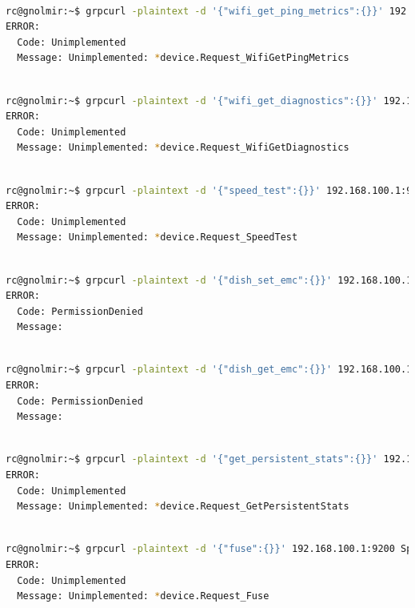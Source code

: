 \documentclass[IN,11pt,twoside,openright,bachelor,english]{tumthesis}
\begin{document}
\begin{lstlisting}[language=bash,basicstyle=\tiny]

rc@gnolmir:~$ grpcurl -plaintext -d '{"wifi_get_ping_metrics":{}}' 192.168.100.1:9200 SpaceX.API.Device.Device/Handle
ERROR:
  Code: Unimplemented
  Message: Unimplemented: *device.Request_WifiGetPingMetrics
  \end{lstlisting}
\begin{lstlisting}[language=bash,basicstyle=\tiny]

rc@gnolmir:~$ grpcurl -plaintext -d '{"wifi_get_diagnostics":{}}' 192.168.100.1:9200 SpaceX.API.Device.Device/Handle
ERROR:
  Code: Unimplemented
  Message: Unimplemented: *device.Request_WifiGetDiagnostics
  \end{lstlisting}
\begin{lstlisting}[language=bash,basicstyle=\tiny]

rc@gnolmir:~$ grpcurl -plaintext -d '{"speed_test":{}}' 192.168.100.1:9200 SpaceX.API.Device.Device/Handle
ERROR:
  Code: Unimplemented
  Message: Unimplemented: *device.Request_SpeedTest
 \end{lstlisting}
\begin{lstlisting}[language=bash,basicstyle=\tiny]

rc@gnolmir:~$ grpcurl -plaintext -d '{"dish_set_emc":{}}' 192.168.100.1:9200 SpaceX.API.Device.Device/Handle
ERROR:
  Code: PermissionDenied
  Message: 
  \end{lstlisting}
\begin{lstlisting}[language=bash,basicstyle=\tiny]

rc@gnolmir:~$ grpcurl -plaintext -d '{"dish_get_emc":{}}' 192.168.100.1:9200 SpaceX.API.Device.Device/Handle
ERROR:
  Code: PermissionDenied
  Message: 
  \end{lstlisting}
\begin{lstlisting}[language=bash,basicstyle=\tiny]

rc@gnolmir:~$ grpcurl -plaintext -d '{"get_persistent_stats":{}}' 192.168.100.1:9200 SpaceX.API.Device.Device/Handle
ERROR:
  Code: Unimplemented
  Message: Unimplemented: *device.Request_GetPersistentStats
\end{lstlisting}
\begin{lstlisting}[language=bash,basicstyle=\tiny]

rc@gnolmir:~$ grpcurl -plaintext -d '{"fuse":{}}' 192.168.100.1:9200 SpaceX.API.Device.Device/Handle
ERROR:
  Code: Unimplemented
  Message: Unimplemented: *device.Request_Fuse
 \end{lstlisting}
\end{document}
